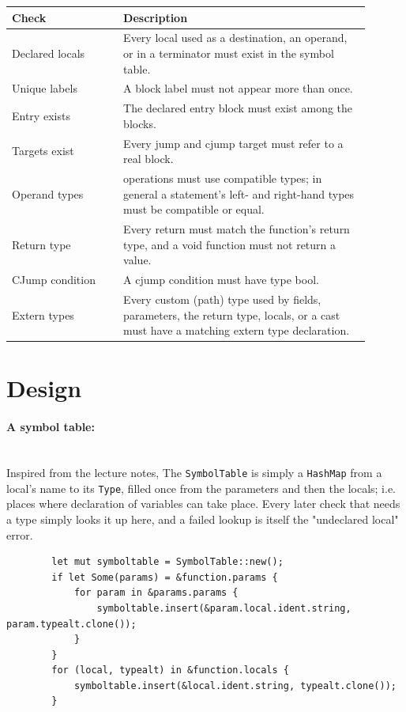 \documentclass[11pt,a4paper,oneside]{report}
\begin{document}
	\begin{longtable}{p{0.28\linewidth}p{0.62\linewidth}}
		\toprule
		\textbf{Check} & \textbf{Description} \\
		\midrule
		Declared locals & Every local used as a destination, an operand, or in a terminator must exist in the symbol table. \\
		\midrule
		Unique labels & A block label must not appear more than once. \\
		\midrule
		Entry exists & The declared entry block must exist among the blocks. \\
		\midrule
		Targets exist & Every jump and cjump target must refer to a real block. \\
		\midrule
		Operand types & operations must use compatible types; in general a statement's left- and right-hand types must be compatible or equal. \\
		\midrule
		Return type & Every return must match the function's return type, and a void function must not return a value. \\
		\midrule
		CJump condition & A cjump condition must have type bool. \\
		\midrule
		Extern types & Every custom (path) type used by fields, parameters, the return type, locals, or a cast must have a matching extern type declaration. \\
		\bottomrule
	\end{longtable}
	
	\section{Design}
	\paragraph{A symbol table:}\mbox{}\\
	Inspired from the lecture notes, The \texttt{SymbolTable} is simply a \texttt{HashMap} from a local's name to its \texttt{Type}, filled once from the parameters and then the locals; i.e. places where declaration of variables can take place. Every later check that needs a type simply looks it up here, and a failed lookup is itself the "undeclared local" error.
	\newpage
	\begin{lstlisting}
		let mut symboltable = SymbolTable::new(); 
		if let Some(params) = &function.params {
			for param in &params.params {
				symboltable.insert(&param.local.ident.string, param.typealt.clone());
			}
		}
		for (local, typealt) in &function.locals {
			symboltable.insert(&local.ident.string, typealt.clone());
		}
	\end{lstlisting}
	
\end{document}

